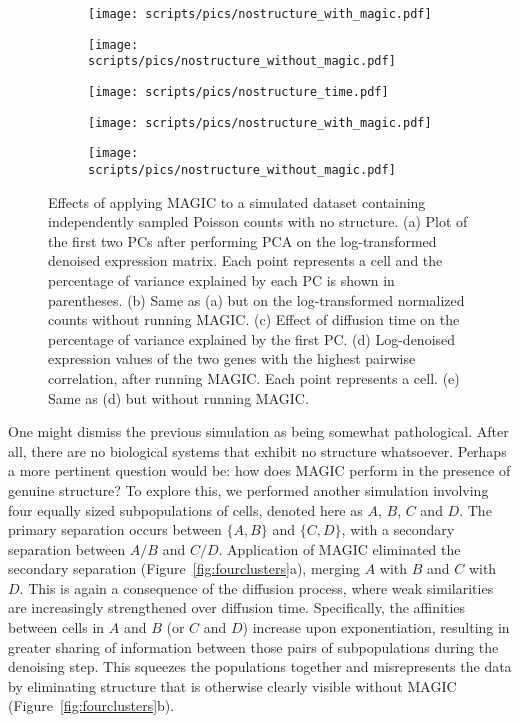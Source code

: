 \documentclass[10pt,letterpaper]{article}
\begin{document}
\begin{figure}[btp]
\centering
\begin{subfigure}[b]{0.49\textwidth}
    \texttt{[image: scripts/pics/nostructure\_with\_magic.pdf]}
    \caption{}
\end{subfigure}
\begin{subfigure}[b]{0.49\textwidth}
    \texttt{[image: scripts/pics/nostructure\_without\_magic.pdf]}
    \caption{}
\end{subfigure}
\begin{subfigure}[b]{\textwidth}
    \texttt{[image: scripts/pics/nostructure\_time.pdf]}
    \caption{}
\end{subfigure}
\begin{subfigure}[b]{0.49\textwidth}
    \texttt{[image: scripts/pics/nostructure\_with\_magic.pdf]}
    \caption{}
\end{subfigure}
\begin{subfigure}[b]{0.49\textwidth}
    \texttt{[image: scripts/pics/nostructure\_without\_magic.pdf]}
    \caption{}
\end{subfigure}
\caption{Effects of applying MAGIC to a simulated dataset containing independently sampled Poisson counts with no structure.
(a) Plot of the first two PCs after performing PCA on the log-transformed denoised expression matrix.
Each point represents a cell and the percentage of variance explained by each PC is shown in parentheses.
(b) Same as (a) but on the log-transformed normalized counts without running MAGIC.
(c) Effect of diffusion time on the percentage of variance explained by the first PC.
(d) Log-denoised expression values of the two genes with the highest pairwise correlation, after running MAGIC.
Each point represents a cell.
(e) Same as (d) but without running MAGIC.}
\label{fig:nostructure}
\end{figure}

One might dismiss the previous simulation as being somewhat pathological.
After all, there are no biological systems that exhibit no structure whatsoever.
Perhaps a more pertinent question would be: how does MAGIC perform in the presence of genuine structure? 
To explore this, we performed another simulation involving four equally sized subpopulations of cells, denoted here as $A$, $B$, $C$ and $D$.
The primary separation occurs between $\{A, B\}$ and $\{C, D\}$, with a secondary separation between $A/B$ and $C/D$.
Application of MAGIC eliminated the secondary separation (Figure~\ref{fig:fourclusters}a), merging $A$ with $B$ and $C$ with $D$.
This is again a consequence of the diffusion process, where weak similarities are increasingly strengthened over diffusion time.
Specifically, the affinities between cells in $A$ and $B$ (or $C$ and $D$) increase upon exponentiation,
resulting in greater sharing of information between those pairs of subpopulations during the denoising step.
This squeezes the populations together and misrepresents the data by eliminating structure that is otherwise clearly visible without MAGIC (Figure~\ref{fig:fourclusters}b).
\end{document}
